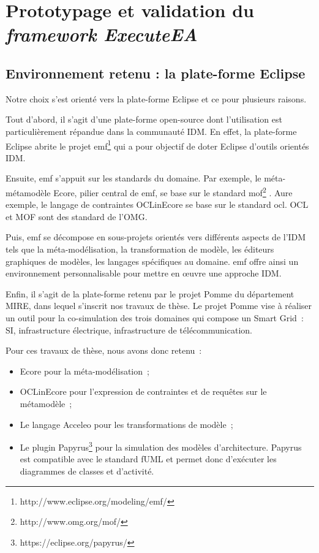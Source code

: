 \chapter{Prototypage et validation du \emph{framework ExecuteEA}}
\label{ch:implem}

\PartialToc


\section{Environnement retenu : la plate-forme Eclipse}

Notre choix s'est orienté vers la plate-forme Eclipse et ce pour plusieurs
raisons.

Tout d'abord, il s'agit d'une plate-forme open-source dont l'utilisation est
particulièrement répandue dans la communauté IDM. En effet, la plate-forme
Eclipse abrite le projet
\gls{emf}\footnote{http://www.eclipse.org/modeling/emf/} qui a pour objectif de
doter Eclipse d'outils orientés IDM.

Ensuite, \gls{emf} s'appuit sur les standards du domaine. Par exemple, le méta-
métamodèle Ecore, pilier central de \gls{emf}, se base sur le standard
\gls{mof}\footnote{http://www.omg.org/mof/} . Aure exemple, le langage de
contraintes OCLinEcore se base sur le standard \gls{ocl}. OCL et MOF sont des
standard de l'OMG.

Puis, \gls{emf} se décompose en sous-projets orientés vers différents aspects de
l'IDM tels que la méta-modélisation, la transformation de modèle, les éditeurs
graphiques de modèles, les langages spécifiques au domaine. \gls{emf} offre
ainsi un environnement personnalisable pour mettre en œuvre une approche IDM.

Enfin, il s'agit de la plate-forme retenu par le projet Pomme du département
MIRE, dans lequel s'inscrit nos travaux de thèse. Le projet Pomme vise à
réaliser un outil pour la co-simulation des trois domaines qui compose un Smart
Grid~: SI, infrastructure électrique, infrastructure de télécommunication.

Pour ces travaux de thèse, nous avons donc retenu~:

\begin{itemize}

    \item Ecore pour la méta-modélisation~;

    \item OCLinEcore pour l'expression de contraintes et de requêtes sur le métamodèle~;

    \item Le langage Acceleo pour les transformations de modèle~;

    \item Le plugin Papyrus\footnote{https://eclipse.org/papyrus/} pour la simulation
    des modèles d'architecture. Papyrus est compatible avec le standard fUML et
    permet donc d'exécuter les diagrammes de classes et d'activité. 

\end{itemize}


